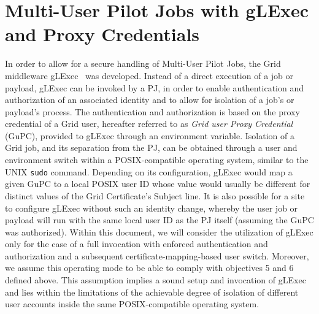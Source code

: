 \documentclass[10pt]{iopart}
\begin{document}
\section{Multi-User Pilot Jobs with gLExec and Proxy Credentials}
\label{mupj}
In order to allow for a secure handling of Multi-User Pilot Jobs, the Grid middleware
gLExec~\cite{glexec} was developed. Instead of a direct execution of a job or
payload, gLExec can be invoked by a PJ, in order to enable authentication and
authorization of an associated identity and to allow for isolation of a job's or
payload's process. The authentication and authorization is based on the proxy
credential of a Grid user, hereafter referred to as \textit{Grid user
Proxy Credential} (GuPC), provided to gLExec through an environment variable.
Isolation of a Grid job, and its separation from the PJ, can be obtained through a 
user and environment switch within a POSIX-compatible operating system, 
similar to the UNIX \texttt{sudo} command.
Depending on its configuration,
gLExec would map a given GuPC to a local POSIX user ID whose value would
usually be different for distinct values of the Grid Certificate's Subject line.
It is also possible for a site to configure gLExec without such an identity change,
whereby the user job or payload will run with the same local user ID as the PJ
itself (assuming the GuPC was authorized).
Within this
document, we will consider the utilization of gLExec only for the case of a
full invocation with enforced authentication and authorization and a subsequent
certificate-mapping-based user switch. Moreover, we
assume this operating mode to be able to comply with
objectives 5 and 6 defined above. This assumption implies a sound setup and
invocation of gLExec and lies within the limitations of the achievable degree
of isolation of 
different user accounts inside the same POSIX-compatible operating system.
\end{document}
